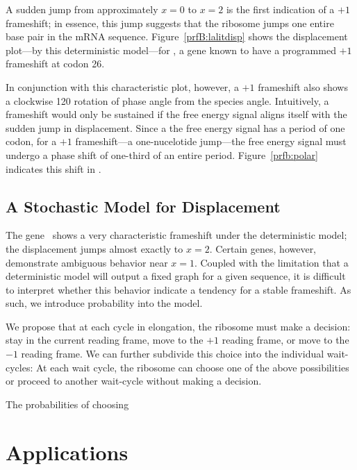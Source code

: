 \documentclass[12pt]{article}
\begin{document}

A sudden jump from approximately $x = 0$ to $x = 2$ is the first indication of a $+1$ frameshift; 
in essence, this jump suggests that the ribosome jumps one entire base pair in the mRNA sequence.
Figure~\ref{prfB:lalitdisp} shows the displacement plot---by this deterministic model---for \prfB, 
a gene known to have a programmed $+1$ frameshift at codon 26.

In conjunction with this characteristic plot, however, a $+1$ frameshift also shows a clockwise 120\degree
rotation of phase angle from the species angle.
Intuitively, a frameshift would only be sustained if the free energy signal aligns itself with the sudden jump in displacement.
Since a the free energy signal has a period of one codon, for a $+1$ frameshift---a one-nucelotide jump---the free energy signal
must undergo a phase shift of one-third of an entire period.  Figure~\ref{prfb:polar} indicates this shift in \prfB.

\subsection{A Stochastic Model for Displacement}


The gene \prfB\ shows a very characteristic frameshift under the deterministic model; the displacement jumps almost exactly to $x=2$.
Certain genes, however, demonstrate ambiguous behavior near $x = 1$.
Coupled with the limitation that a deterministic model will output a fixed graph for a given sequence, 
it is difficult to interpret whether this behavior indicate a tendency for a stable frameshift.
As such, we introduce probability into the model.

We propose that at each cycle in elongation, the ribosome must make a decision: stay in the current reading frame, move to the $+1$ reading frame,
or move to the $-1$ reading frame.  We can further subdivide this choice into the individual wait-cycles: 
At each wait cycle, the ribosome can choose one of the above possibilities or proceed to another wait-cycle without making a decision.

The probabilities of choosing

\section{Applications}
\end{document}
